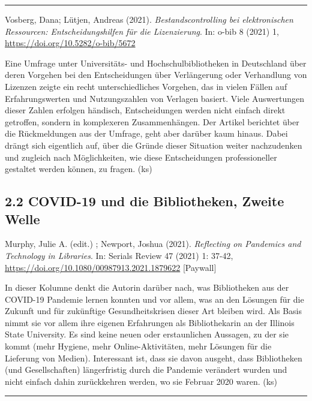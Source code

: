 \documentclass[a4paper,
fontsize=11pt,
oneside,
numbers=noperiodatend,
parskip=half-,
bibliography=totoc,
final
]{scrartcl}
\begin{document}
\begin{center}\rule{0.5\linewidth}{0.5pt}\end{center}

Vosberg, Dana; Lütjen, Andreas (2021). \emph{Bestandscontrolling bei
elektronischen Ressourcen: Entscheidungshilfen für die Lizenzierung}.
In: o-bib 8 (2021) 1, \url{https://doi.org/10.5282/o-bib/5672}

Eine Umfrage unter Universitäts- und Hochschulbibliotheken in
Deutschland über deren Vorgehen bei den Entscheidungen über Verlängerung
oder Verhandlung von Lizenzen zeigte ein recht unterschiedliches
Vorgehen, das in vielen Fällen auf Erfahrungswerten und Nutzungszahlen
von Verlagen basiert. Viele Auswertungen dieser Zahlen erfolgen
händisch, Entscheidungen werden nicht einfach direkt getroffen, sondern
in komplexeren Zusammenhängen. Der Artikel berichtet über die
Rückmeldungen aus der Umfrage, geht aber darüber kaum hinaus. Dabei
drängt sich eigentlich auf, über die Gründe dieser Situation weiter
nachzudenken und zugleich nach Möglichkeiten, wie diese Entscheidungen
professioneller gestaltet werden können, zu fragen. (ks)

\hypertarget{covid-19-und-die-bibliotheken-zweite-welle}{%
\subsection{2.2 COVID-19 und die Bibliotheken, Zweite
Welle}\label{covid-19-und-die-bibliotheken-zweite-welle}}

Murphy, Julie A. (edit.) ; Newport, Joshua (2021). \emph{Reflecting on
Pandemics and Technology in Libraries}. In: Serials Review 47 (2021) 1:
37-42, \url{https://doi.org/10.1080/00987913.2021.1879622} {[}Paywall{]}

In dieser Kolumne denkt die Autorin darüber nach, was Bibliotheken aus
der COVID-19 Pandemie lernen konnten und vor allem, was an den Lösungen
für die Zukunft und für zukünftige Gesundheitskrisen dieser Art bleiben
wird. Als Basis nimmt sie vor allem ihre eigenen Erfahrungen als
Bibliothekarin an der Illinois State University. Es sind keine neuen
oder erstaunlichen Aussagen, zu der sie kommt (mehr Hygiene, mehr
Online-Aktivitäten, mehr Lösungen für die Lieferung von Medien).
Interessant ist, dass sie davon ausgeht, dass Bibliotheken (und
Gesellschaften) längerfristig durch die Pandemie verändert wurden und
nicht einfach dahin zurückkehren werden, wo sie Februar 2020 waren. (ks)

\begin{center}\rule{0.5\linewidth}{0.5pt}\end{center}
\end{document}
